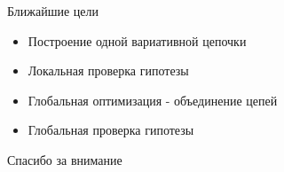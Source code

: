 
\begin{frame}{Ближайшие цели}
\begin{itemize}
\item Построение одной вариативной цепочки \\
\item Локальная проверка гипотезы \\
\item Глобальная оптимизация - объединение цепей \\
\item Глобальная проверка гипотезы
\end{itemize}
\end{frame}

\begin{frame}{}

\begin{center}
{\Huge Спасибо за внимание}
\end{center}

\end{frame}